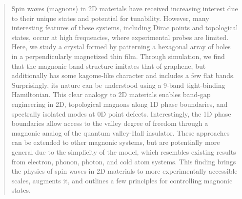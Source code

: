 \documentclass[aps,prx,twocolumn,superscriptaddress,floatfix]{revtex4-2}
\begin{document}
\begin{abstract}
Spin waves (magnons) in 2D materials have received increasing interest due to their unique states and potential for tunability. However, many interesting features of these systems, including Dirac points and topological states, occur at high frequencies, where experimental probes are limited. Here, we study a crystal formed by patterning a hexagonal array of holes in a perpendicularly magnetized thin film. Through simulation, we find that the magnonic band structure imitates that of graphene, but additionally has some kagome-like character and includes a few flat bands. Surprisingly, its nature can be understood using a 9-band tight-binding Hamiltonian. This clear analogy to 2D materials enables band-gap engineering in 2D, topological magnons along 1D phase boundaries, and spectrally isolated modes at 0D point defects. Interestingly, the 1D phase boundaries allow access to the valley degree of freedom through a magnonic analog of the quantum valley-Hall insulator. These approaches can be extended to other magnonic systems, but are potentially more general due to the simplicity of the model, which resembles existing results from electron, phonon, photon, and cold atom systems. This finding brings the physics of spin waves in 2D materials to more experimentally accessible scales, augments it, and outlines a few principles for controlling magnonic states.
\end{abstract}


\maketitle

\end{document}
